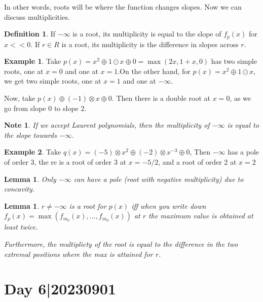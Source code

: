 \documentclass[12pt]{memoir}
\newtheorem{note}{Note}
\newtheorem{protolemma}[prototheorem]{Lemma}
\newenvironment{lemma}
   {\begin{protolemma}}
   {\end{protolemma}}
\theoremstyle{definition}
\newtheorem{protoexample}{Example}[section]
\newenvironment{ex}
   {\begin{protoexample}}
   {\end{protoexample}}
\newtheorem{protodefinition}{Definition}[section]
\newenvironment{define}
   {\begin{protodefinition}}
   {\end{protodefinition}}
\begin{document}
In other words, roots will be where the function changes slopes. Now we can discuss multiplicities.


\begin{define}
    If $- \infty$ is a root, its multiplicity is equal to the slope of $f_p(x)$ for $x<<0$. If $r\in R$ is a root, its multiplicity is the difference in slopes across $r$.
\end{define}

\begin{ex}
    Take $p(x) = x^2 \oplus 1\odot x \oplus 0= \max(2x,1+x, 0)$  has two simple roots, one at $x=0$ and one at $x=1$.On the other hand, for $p(x) = x^2\oplus 1 \odot x$, we get two simple roots, one at $x=1$ and one at $- \infty$.


    Now, take $p(x) \oplus (-1)\otimes x \oplus 0$. Then there is a double root at $x=0$, as we go from slope $0$ to slope $2$.
\end{ex}



\begin{note}
    If we accept Laurent polynomials, then the multiplicity of $-\infty$ is equal to the slope towards $- \infty$.
\end{note}


\begin{ex}
    Take $q(x) = (-5)\otimes x^2 \oplus (-2) \otimes x^{-3} \oplus 0$, Then $-\infty$ has a pole of order $3$, the re is a root of order 3 at $x= -5/2$, and a root of order 2 at $x=2$
\end{ex}

\begin{lemma}
    Only $-\infty$ can have a pole (root with negative multiplicity) due to concavity.
\end{lemma}


\begin{lemma}
    $r \neq -\infty$ is a root for $p(x)$ iff when you write down $f_p(x) = \max( f_{m_0}(x), \dots, f_{m_d}(x) )$ at $r$ the maximum value is obtained at least twice.

    Furthermore, the multiplicty of the root is equal to the difference in the two extremal positions where the max is attained for $r$.
\end{lemma}












\section{Day 6|20230901}
\end{document}
